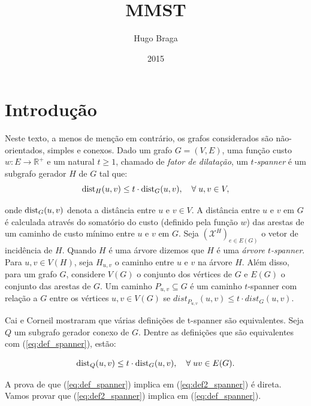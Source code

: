 \documentclass[11pt,reqno]{amsart}
\title{MMST}
\author{Hugo Braga}
\date{2015}
\newcommand{\dist}{{\rm dist}}
\newcommand{\incid}{\mathcal{X}}
\begin{document}
\maketitle

\section{Introdução}
Neste texto, a menos de menção em contrário, os grafos considerados
são não-orientados, simples e conexos.  Dado um grafo $G=(V,E)$, 
uma função custo $w: E \to \mathbb{R}^+$ e um
natural $t \ge 1$, chamado de \emph{fator de dilatação}, um
\emph{$t$-spanner} é um subgrafo gerador $H$ de $G$ tal que:
\begin{equation}
\dist_{H}(u,v) \le t \cdot \dist_{G}(u,v), \quad \forall\;u,v \in V, 
\label{eq:def_spanner}
\end{equation}

\noindent onde $\dist_{G}(u,v)$ denota a distância entre $u$ e $v \in V$. 
A distância entre $u$ e $v$ em $G$ é calculada através do 
somatório do custo (definido pela 
função $w$) das arestas de um caminho de custo mínimo entre $u$ e $v$ em $G$. 
Seja $(\incid^{H})_{e \in E(G)}$ o vetor de incidência de $H$. 
Quando $H$ é uma árvore dizemos que $H$ é uma \emph{árvore $t$-spanner}. 
Para $u,v \in V(H)$, seja $H_{u,v}$ o caminho entre $u$ e $v$ na árvore  $H$.
Além disso, para um grafo $G$, considere $V(G)$ o conjunto 
dos vértices de $G$ e $E(G)$ o conjunto das arestas de $G$. 
Um caminho $P_{u,v} \subseteq G$ é um caminho $t$-spanner com 
relação a $G$ entre os vértices $u,v \in V(G)$ se 
$dist_{P_{u,v}}(u,v) \le t \cdot dist_{G}(u,v)$. 

Cai e Corneil \cite{CaiC1995} 
mostraram que várias definições de t-spanner são equivalentes. 
Seja $Q$ um subgrafo gerador conexo de $G$.
Dentre as definições que são equivalentes com (\ref{eq:def_spanner}), estão:

\begin{equation}
\dist_{Q}(u,v) \le t \cdot \dist_{G}(u,v), \quad \forall\;uv \in E(G).
\label{eq:def2_spanner}
\end{equation}

A prova de que (\ref{eq:def_spanner}) implica em (\ref{eq:def2_spanner}) 
é direta. 
Vamos provar que (\ref{eq:def2_spanner}) implica em (\ref{eq:def_spanner}). 
\end{document}
